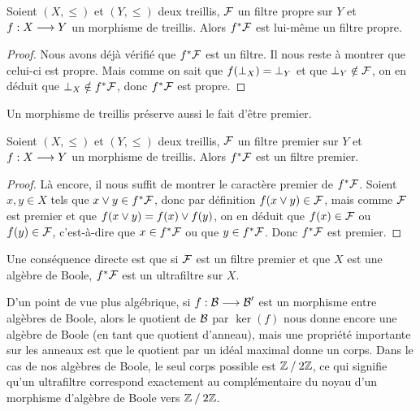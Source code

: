 \begin{property}
  Soient $(X,\leq)$ et $(Y,\leq)$ deux treillis, $\mathcal{F}$ un filtre propre
  sur $Y$ et $f : \displaystyle X \longrightarrow Y$ un morphisme de treillis. Alors
  $f^*\mathcal{F}$ est lui-même un filtre propre.
\end{property}

\begin{proof}
  Nous avons déjà vérifié que $f^*\mathcal{F}$ est un filtre. Il nous reste à
  montrer que celui-ci est propre. Mais comme on sait que $f(\bot_X)=\bot_Y$
  et que $\bot_Y\notin\mathcal{F}$, on en déduit que
  $\bot_X\notin f^*\mathcal{F}$, donc $f^*\mathcal{F}$ est propre.
\end{proof}

\noindent
Un morphisme de treillis préserve aussi le fait d'être premier.

\begin{property}
  Soient $(X,\leq)$ et $(Y,\leq)$ deux treillis, $\mathcal{F}$ un filtre premier
  sur $Y$ et $f : \displaystyle X \longrightarrow Y$ un morphisme de treillis. Alors
  $f^*\mathcal{F}$ est un filtre premier.
\end{property}

\begin{proof}
  Là encore, il nous suffit de montrer le caractère premier de
  $f^*\mathcal{F}$.
  Soient $x,y\in X$ tels que $x\vee y \in f^*\mathcal{F}$, donc par
  définition
  $f(x\vee y)\in \mathcal{F}$, mais comme $\mathcal{F}$ est premier et que
  $f(x\vee y) = f(x)\vee f(y)$, on en déduit que $f(x)\in\mathcal{F}$ ou
  $f(y)\in\mathcal{F}$, c'est-à-dire que $x\in f^*\mathcal{F}$ ou que
  $y\in f^*\mathcal{F}$. Donc $f^*\mathcal{F}$ est premier.
\end{proof}

Une conséquence directe est que si $\mathcal{F}$ est un filtre premier et que $X$
est une algèbre de Boole, $f^*\mathcal{F}$ est un ultrafiltre sur $X$.

D'un point de vue plus algébrique, si $f : \displaystyle \mathcal{B} \longrightarrow \mathcal{B}'$ est un
morphisme entre algèbres de Boole, alors le quotient de $\mathcal{B}$ par
$\ker(f)$ nous donne encore une algèbre de Boole (en tant que quotient
d'anneau), mais une propriété importante sur les anneaux est que le quotient par
un idéal maximal donne un corps. Dans le cas de nos algèbres de Boole, le
seul corps possible est $\mathord{\mathbb Z}\mathbin{/}\mathord{2\mathbb Z}$, ce qui signifie qu'un ultrafiltre
correspond exactement au complémentaire du noyau d'un morphisme d'algèbre de
Boole vers $\mathord{\mathbb Z}\mathbin{/}\mathord{2\mathbb Z}$.

